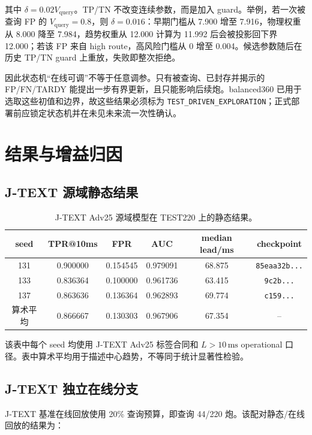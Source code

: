 \documentclass[11pt,a4paper]{article}
\newcommand{\code}[1]{\texttt{\small #1}}
\begin{document}
其中 \(\delta=0.02V_{\mathrm{query}}\)。TP/TN 不改变连续参数，而是加入 guard。举例，若一次被查询 FP 的 \(V_{\mathrm{query}}=0.8\)，则 \(\delta=0.016\)：早期门槛从 7.900 增至 7.916，物理权重从 8.000 降至 7.984，趋势权重从 12.000 计算为 11.992 后会被投影回下界 12.000；若该 FP 来自 high route，高风险门槛从 0 增至 0.004。候选参数随后在历史 TP/TN guard 上重放，失败即整次拒绝。

因此状态机“在线可调”不等于任意调参。只有被查询、已封存并揭示的 FP/FN/TARDY 能提出一步有界更新，且只能影响后续炮。balanced360 已用于选取这些初值和边界，故这些结果必须标为 \code{TEST\_DRIVEN\_EXPLORATION}；正式部署前应锁定状态机并在未见未来流一次性确认。

\section{结果与增益归因}

\subsection{J-TEXT 源域静态结果}

\begin{table}[H]
\centering
\caption{J-TEXT Adv25 源域模型在 TEST220 上的静态结果。}
\small
\begin{tabular}{c c c c c c}
\toprule
seed & TPR@10ms & FPR & AUC & median lead/ms & checkpoint\\
\midrule
131 & 0.900000 & 0.154545 & 0.979091 & 68.875 & \code{85eaa32b...}\\
133 & 0.836364 & 0.100000 & 0.961736 & 63.415 & \code{9c2b...}\\
137 & 0.863636 & 0.136364 & 0.962893 & 69.774 & \code{c159...}\\
\midrule
算术平均 & 0.866667 & 0.130303 & 0.967906 & 67.354 & --\\
\bottomrule
\end{tabular}
\end{table}

该表中每个 seed 均使用 J-TEXT Adv25 标签合同和 \(L>10\,\mathrm{ms}\) operational 口径。表中算术平均用于描述中心趋势，不等同于统计显著性检验。

\subsection{J-TEXT 独立在线分支}

J-TEXT 基准在线回放使用 20\% 查询预算，即查询 44/220 炮。该配对静态/在线回放的结果为：
\end{document}
